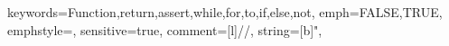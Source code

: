 {keywords={Function,return,assert,while,for,to,if,else,not},%
emph={FALSE,TRUE},
emphstyle=\color{colconst},
sensitive=true,%
comment=[l]{//},%
string=[b]",%
}
